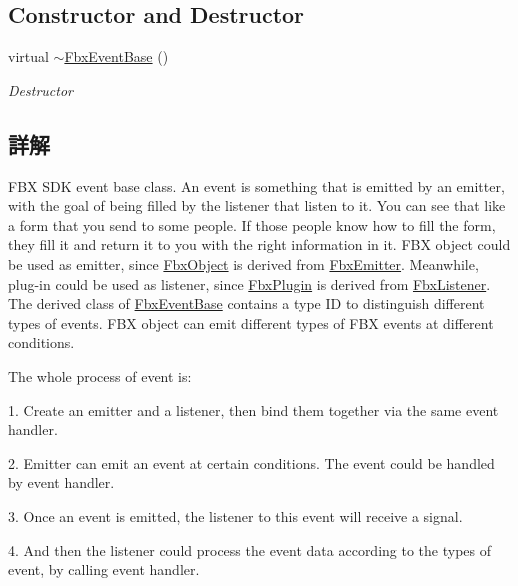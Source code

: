 \subsection*{Constructor and Destructor}
\begin{DoxyCompactItemize}
\item 
virtual \hyperlink{class_fbx_event_base_aa95657834201b514cb515cf60d371938}{$\sim$\+Fbx\+Event\+Base} ()
\begin{DoxyCompactList}\small\item\em Destructor \end{DoxyCompactList}\end{DoxyCompactItemize}


\subsection{詳解}
F\+BX S\+DK event base class. An event is something that is emitted by an emitter, with the goal of being filled by the listener that listen to it. You can see that like a form that you send to some people. If those people know how to fill the form, they fill it and return it to you with the right information in it. F\+BX object could be used as emitter, since \hyperlink{class_fbx_object}{Fbx\+Object} is derived from \hyperlink{class_fbx_emitter}{Fbx\+Emitter}. Meanwhile, plug-\/in could be used as listener, since \hyperlink{class_fbx_plugin}{Fbx\+Plugin} is derived from \hyperlink{class_fbx_listener}{Fbx\+Listener}. The derived class of \hyperlink{class_fbx_event_base}{Fbx\+Event\+Base} contains a type ID to distinguish different types of events. F\+BX object can emit different types of F\+BX events at different conditions. \begin{DoxyParagraph}{The whole process of event is\+:}
\begin{DoxyItemize}
\item 1. Create an emitter and a listener, then bind them together via the same event handler. \item 2. Emitter can emit an event at certain conditions. The event could be handled by event handler. \item 3. Once an event is emitted, the listener to this event will receive a signal. \item 4. And then the listener could process the event data according to the types of event, by calling event handler. \end{DoxyItemize}

\end{DoxyParagraph}

